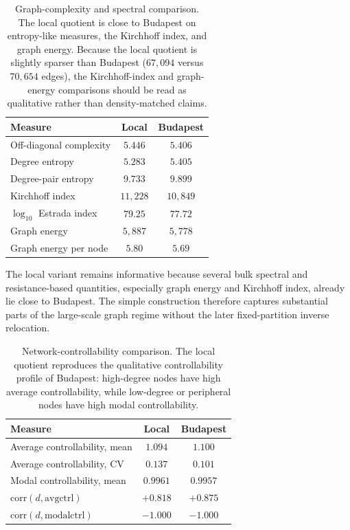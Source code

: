 \documentclass[12pt]{article}
\begin{document}
\begin{table}[t]
\centering
\small
\setlength{\tabcolsep}{4pt}
\begin{tabular}{lcc}
\toprule
Measure & Local & Budapest \\
\midrule
Off-diagonal complexity & \(5.446\) & \(5.406\) \\
Degree entropy & \(5.283\) & \(5.405\) \\
Degree-pair entropy & \(9.733\) & \(9.899\) \\
Kirchhoff index & \(11{,}228\) & \(10{,}849\) \\
\(\log_{10}\) Estrada index & \(79.25\) & \(77.72\) \\
Graph energy & \(5{,}887\) & \(5{,}778\) \\
Graph energy per node & \(5.80\) & \(5.69\) \\
\bottomrule
\end{tabular}
\caption{Graph-complexity and spectral comparison.  The local quotient is
close to Budapest on entropy-like measures, the Kirchhoff index, and graph
energy.  Because the local quotient is slightly sparser than Budapest
(\(67{,}094\) versus \(70{,}654\) edges), the Kirchhoff-index and
graph-energy comparisons should be read as qualitative rather than
density-matched claims.}
\label{tab:local-repair-complexity}
\end{table}

The local variant remains informative because several bulk spectral and
resistance-based quantities, especially graph energy and Kirchhoff index,
already lie close to Budapest.  The simple construction therefore captures
substantial parts of the large-scale graph regime without the later
fixed-partition inverse relocation.

\begin{table}[t]
\centering
\small
\setlength{\tabcolsep}{4pt}
\begin{tabular}{lcc}
\toprule
Measure & Local & Budapest \\
\midrule
Average controllability, mean & \(1.094\) & \(1.100\) \\
Average controllability, CV & \(0.137\) & \(0.101\) \\
Modal controllability, mean & \(0.9961\) & \(0.9957\) \\
\(\mathrm{corr}(d,\mathrm{avgctrl})\) & \(+0.818\) & \(+0.875\) \\
\(\mathrm{corr}(d,\mathrm{modalctrl})\) & \(-1.000\) & \(-1.000\) \\
\bottomrule
\end{tabular}
\caption{Network-controllability comparison.  The local quotient reproduces
the qualitative controllability profile of Budapest: high-degree nodes have
high average controllability, while low-degree or peripheral nodes have high
modal controllability.}
\label{tab:local-repair-controllability}
\end{table}
\end{document}
